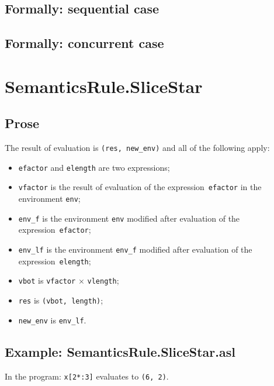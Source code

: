 \documentclass{book}
\begin{document}
\begin{emptyformal}
  \subsection{Formally: sequential case}

  \subsection{Formally: concurrent case}
\end{emptyformal}


\section{SemanticsRule.SliceStar \label{sec:SemanticsRule.SliceStar}}

  \subsection{Prose}
  The result of evaluation is \texttt{(res, new\_env)} and all of the following
apply:
  \begin{itemize}
  \item \texttt{efactor} and \texttt{elength} are two expressions;
  \item \texttt{vfactor} is the result of evaluation of the expression~\texttt{efactor} in the environment \texttt{env}; 
  \item \texttt{env\_f} is the environment \texttt{env} modified after evaluation of the expression~\texttt{efactor}; 
  \item \texttt{env\_lf} is the environment \texttt{env\_f} modified after evaluation of the expression~\texttt{elength};
  \item \texttt{vbot} is \texttt{vfactor} $\times$ \texttt{vlength};
  \item \texttt{res} is \texttt{(vbot, length)};
  \item \texttt{new\_env} is \texttt{env\_lf}.
  \end{itemize}


  \subsection{Example: SemanticsRule.SliceStar.asl}
  In the program:
  \texttt{x[2*:3]} evaluates to \texttt{(6, 2)}.
\end{document}
